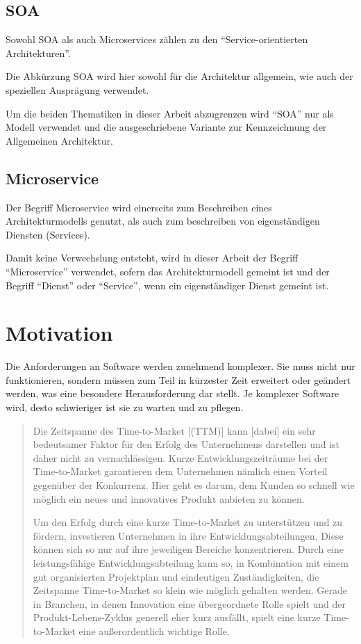 \subsection*{SOA}
Sowohl SOA als auch Microservices zählen zu den "`Service-orientierten Architekturen"'.

Die Abkürzung SOA wird hier sowohl für die Architektur allgemein, wie auch der speziellen Ausprägung verwendet.

Um die beiden Thematiken in dieser Arbeit abzugrenzen wird "`SOA"' nur als Modell verwendet und die ausgeschriebene Variante zur Kennzeichnung der Allgemeinen Architektur.

\subsection*{Microservice}
Der Begriff Microservice wird einerseits zum Beschreiben eines Architekturmodells genutzt, als auch zum beschreiben von eigenständigen Diensten (Services).

Damit keine Verwechslung entsteht, wird in dieser Arbeit der Begriff "`Microservice"' verwendet, sofern das Architekturmodell gemeint ist und der Begriff "`Dienst"' oder "`Service"', wenn ein eigenständiger Dienst gemeint ist.

\section{Motivation}
\label{sec:motivation}
Die Anforderungen an Software werden zunehmend komplexer. Sie muss nicht nur funktionieren, sondern müssen zum Teil in kürzester Zeit erweitert oder geändert werden, was eine besondere Herausforderung dar stellt. Je komplexer Software wird, desto schwieriger ist sie zu warten und zu pflegen. 

\begin{quotation}
\frqq Die Zeitspanne des Time-to-Market [(TTM)] kann [dabei] ein sehr bedeutsamer Faktor für den Erfolg des Unternehmens darstellen und ist daher nicht zu vernachlässigen. Kurze Entwicklungszeiträume bei der Time-to-Market garantieren dem Unternehmen nämlich einen Vorteil gegenüber der Konkurrenz. Hier geht es darum, dem Kunden so schnell wie möglich ein neues und innovatives Produkt anbieten zu können.
    
Um den Erfolg durch eine kurze Time-to-Market zu unterstützen und zu fördern, investieren Unternehmen in ihre Entwicklungsabteilungen. Diese können sich so nur auf ihre jeweiligen Bereiche konzentrieren. Durch eine leistungsfähige Entwicklungsabteilung kann so, in Kombination mit einem gut organisierten Projektplan und eindeutigen Zuständigkeiten, die Zeitspanne Time-to-Market so klein wie möglich gehalten werden. Gerade in Branchen, in denen Innovation eine übergeordnete Rolle spielt und der Produkt-Lebens-Zyklus generell eher kurz ausfällt, spielt eine kurze Time-to-Market eine außerordentlich wichtige Rolle.\flqq \cite{ttm}
\end{quotation}

